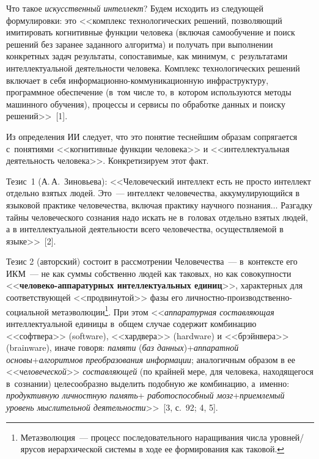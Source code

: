 


\thispagestyle{headings}

\begin{multicols}{2}

\label{st\stat}
      
  Что такое \textit{искусственный интеллект}? Будем исходить из 
следующей формулировки: это <<комплекс технологических решений, 
поз\-во\-ля\-ющий имитировать когнитивные функции человека (включая 
самообучение и поиск решений без заранее заданного алгоритма) и получать 
при выполнении конкретных задач результаты, сопоставимые, как минимум, 
с~результатами интеллектуальной деятельности человека. Комплекс 
технологических решений включает в себя  
ин\-фор\-ма\-ци\-он\-но-ком\-му\-ни\-ка\-ци\-он\-ную инфраструктуру, 
программное обеспечение (в~том числе то, в~котором используются методы 
машинного обучения), процессы и сервисы по обработке данных и поиску 
решений>>~[1].
  
  Из определения ИИ следует, что это понятие теснейшим образам сопрягается 
с~понятиями <<когнитивные функции человека>> и <<интеллектуальная 
деятельность человека>>. Конкретизируем этот факт.
  
  Тезис~1 (А.\,А.~Зиновьева): <<Человеческий интеллект есть не просто 
интеллект отдельно взятых людей. Это~--- интеллект человечества, 
аккумулирующийся в языковой практике человечества, включая практику 
научного познания$\ldots$ Разгадку тайны человеческого сознания надо искать не 
в~головах отдельно взятых людей, а в интеллектуальной деятельности всего 
человечества, осуществляемой в языке>>~[2]. 
  
  Тезис 2 (авторский) состоит в рассмотрении Человечества~--- в~контексте 
его ИКМ~--- не как 
суммы собственно людей как таковых, но как со\-во\-куп\-ности  
<<\textbf{че\-ло\-ве\-ко-ап\-па\-ра\-тур\-ных интеллектуальных единиц}>>, 
характерных для соответствующей <<про\-дви\-ну\-той>> фазы его  
лич\-ност\-но-про\-из\-вод\-ст\-вен\-но-со\-ци\-аль\-ной 
метаэволюции\footnote[2]{Метаэволюция~--- процесс последовательного наращивания чис\-ла 
уровней/ярусов иерархической сис\-те\-мы в ходе ее формирования как таковой.}. При этом 
<<\textit{аппаратурная составляющая} интеллектуальной единицы в~общем 
случае содержит комбинацию <<софтвера>> (software), <<хардвера>> 
(hardware) и <<брэйнвера>>\linebreak (brainware), иначе говоря: \textit{памяти} 
(\textit{баз данных})\;+\;\textit{аппаратной основы}\;+\;\textit{алгоритмов 
преобразования информации}; аналогичным образом в ее 
<<\textit{человеческой}>> \textit{со\-став\-ля\-ющей} (по крайней мере, для 
человека, находящегося в~сознании) целесообразно выделить подобную же 
комбинацию, а~именно: \textit{продуктивную личностную па\-мять}\;+\; 
\textit{ра\-бо\-то\-спо\-соб\-ный мозг}\;+\;\textit{при\-ем\-ле\-мый уровень 
мыслительной деятельности}>>~[3, с.~92; 4, 5].
  

\end{multicols}
